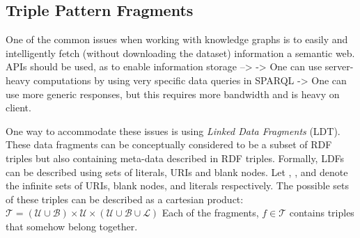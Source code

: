 
\subsection{Triple Pattern Fragments}
One of the common issues when working with knowledge graphs is to easily and intelligently fetch (without downloading the dataset) information a semantic web. \cite{TPF} 
APIs should be used, as to enable information storage --> 
 -> One can use server-heavy computations by using very specific data queries in SPARQL
 -> One can use more generic responses, but this requires more bandwidth and is heavy on client. 



One way to accommodate these issues is using \textit{Linked Data Fragments} (LDT).
These data fragments can be conceptually considered to be a subset of RDF triples but also containing meta-data described in RDF triples.
Formally, LDFs can be described using sets of literals, URIs and blank nodes. 
Let , , and  denote the infinite sets of URIs, blank nodes, and literals respectively. 
The possible sets of these triples can be described as a cartesian product: \begin{math}
    \mathcal{T} = ( \mathcal{U} \cup \mathcal{B}) \times  \mathcal{U} \times ( \mathcal{U} \cup \mathcal{B} \cup \mathcal{L}) 
\end{math}
Each of the fragments, $f \in \mathcal{T}$ contains triples that somehow belong together.




